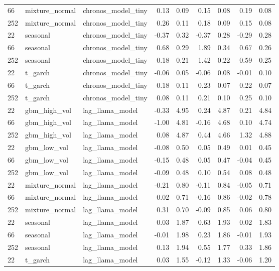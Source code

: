{\begin{tabular}{lllrrrrrr}
66 & mixture\_normal & chronos\_model\_tiny & 0.13 & 0.09 & 0.15 & 0.08 & 0.19 & 0.08 \\
252 & mixture\_normal & chronos\_model\_tiny & 0.26 & 0.11 & 0.18 & 0.09 & 0.15 & 0.08 \\
\midrule
22 & seasonal & chronos\_model\_tiny & -0.37 & 0.32 & -0.37 & 0.28 & -0.29 & 0.28 \\
66 & seasonal & chronos\_model\_tiny & 0.68 & 0.29 & 1.89 & 0.34 & 0.67 & 0.26 \\
252 & seasonal & chronos\_model\_tiny & 0.18 & 0.21 & 1.42 & 0.22 & 0.59 & 0.25 \\
\midrule
22 & t\_garch & chronos\_model\_tiny & -0.06 & 0.05 & -0.06 & 0.08 & -0.01 & 0.10 \\
66 & t\_garch & chronos\_model\_tiny & 0.18 & 0.11 & 0.23 & 0.07 & 0.22 & 0.07 \\
252 & t\_garch & chronos\_model\_tiny & 0.08 & 0.11 & 0.21 & 0.10 & 0.25 & 0.10 \\
\midrule
22 & gbm\_high\_vol & lag\_llama\_model & -0.33 & 4.95 & 0.24 & 4.87 & 0.21 & 4.84 \\
66 & gbm\_high\_vol & lag\_llama\_model & -1.00 & 4.81 & -0.16 & 4.68 & 0.10 & 4.74 \\
252 & gbm\_high\_vol & lag\_llama\_model & 0.08 & 4.87 & 0.44 & 4.66 & 1.32 & 4.88 \\
\midrule
22 & gbm\_low\_vol & lag\_llama\_model & -0.08 & 0.50 & 0.05 & 0.49 & 0.01 & 0.45 \\
66 & gbm\_low\_vol & lag\_llama\_model & -0.15 & 0.48 & 0.05 & 0.47 & -0.04 & 0.45 \\
252 & gbm\_low\_vol & lag\_llama\_model & -0.09 & 0.48 & 0.10 & 0.54 & 0.08 & 0.48 \\
\midrule
22 & mixture\_normal & lag\_llama\_model & -0.21 & 0.80 & -0.11 & 0.84 & -0.05 & 0.71 \\
66 & mixture\_normal & lag\_llama\_model & 0.02 & 0.71 & -0.16 & 0.86 & -0.02 & 0.78 \\
252 & mixture\_normal & lag\_llama\_model & 0.31 & 0.70 & -0.09 & 0.85 & 0.06 & 0.80 \\
\midrule
22 & seasonal & lag\_llama\_model & 0.03 & 1.87 & 0.63 & 1.93 & 0.02 & 1.83 \\
66 & seasonal & lag\_llama\_model & -0.01 & 1.98 & 0.23 & 1.86 & -0.01 & 1.93 \\
252 & seasonal & lag\_llama\_model & 0.13 & 1.94 & 0.55 & 1.77 & 0.33 & 1.86 \\
\midrule
22 & t\_garch & lag\_llama\_model & 0.03 & 1.55 & -0.12 & 1.33 & -0.06 & 1.20 \\

\end{tabular}}
